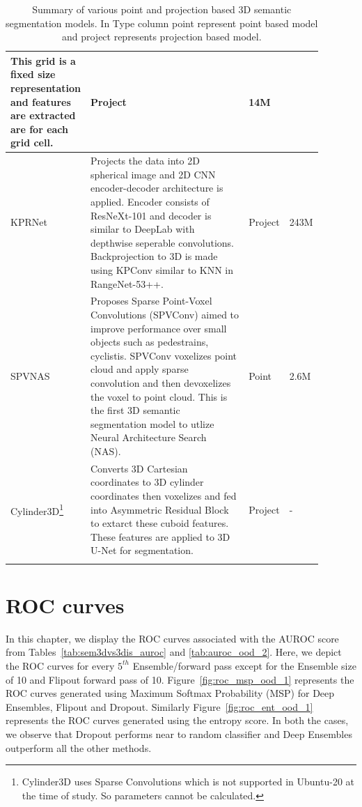 \begin{longtable}{|p{0.15\linewidth} | p{0.59\linewidth}| p{0.06\linewidth} |p{0.09\linewidth}|}
            This grid is a fixed size representation and features are extracted are for each grid cell.
            & Project & 14M \\
            \hline
            KPRNet\cite{kochanov2020kprnet} &
            Projects the data into 2D spherical image and 2D CNN encoder-decoder architecture is applied.
            Encoder consists of ResNeXt-101 and decoder is similar to DeepLab with depthwise seperable convolutions.
            Backprojection to 3D is made using KPConv similar to KNN in RangeNet-53++.
            & Project & 243M \\
            \hline
            SPVNAS\cite{spvnas} &
            Proposes Sparse Point-Voxel Convolutions (SPVConv) aimed to improve performance over small objects such as pedestrains, cyclistis.
            SPVConv voxelizes point cloud and apply sparse convolution and then devoxelizes the voxel to point cloud.
            This is the first 3D semantic segmentation model to utlize Neural Architecture Search (NAS).
            & Point & 2.6M \\
            \hline
            Cylinder3D\cite{zhu2020cylindrical}\footnote{Cylinder3D uses Sparse Convolutions which is not supported in Ubuntu-20 at the time of study. So parameters cannot be calculated.} &
            Converts 3D Cartesian coordinates to 3D cylinder coordinates then voxelizes and fed into Asymmetric Residual Block to extarct these cuboid features.
            These features are applied to 3D U-Net for segmentation.
            & Project & - \\
            \hline
            \caption{Summary of various point and projection based 3D semantic segmentation models. In Type column point represent point based model and project represents projection based model.}
            \label{tab:model_relatedwork}
    \end{longtable}
    
    \chapter{ROC curves}
    \label{sec:app_roc_curves}
    In this chapter, we display the ROC curves associated with the AUROC score from Tables~\ref{tab:sem3dvs3dis_auroc} and \ref{tab:auroc_ood_2}.
    Here, we depict the ROC curves for every $5^{th}$ Ensemble/forward pass except for the Ensemble size of 10 and Flipout forward pass of 10.
    Figure~\ref{fig:roc_msp_ood_1} represents the ROC curves generated using Maximum Softmax Probability (MSP) for Deep Ensembles, Flipout and Dropout.
    Similarly Figure~\ref{fig:roc_ent_ood_1} represents the ROC curves generated using the entropy score.
    In both the cases, we observe that Dropout performs near to random classifier and Deep Ensembles outperform all the other methods.

